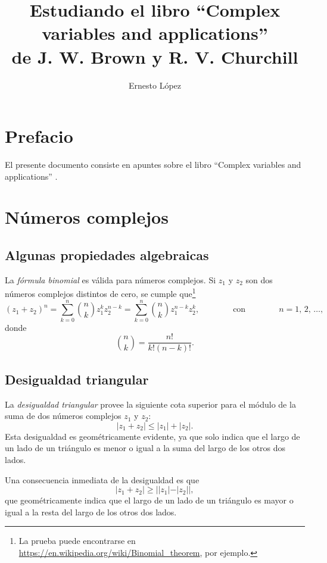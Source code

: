 \documentclass[a4paper]{report}
\title{Estudiando el libro ``Complex variables and applications''\\de J. W. Brown y R. V. Churchill}
\author{Ernesto López}
\begin{document}
 

\hypersetup{pageanchor=false}
\maketitle
\hypersetup{pageanchor=true}
\tableofcontents


\chapter*{Prefacio}

El presente documento consiste en apuntes sobre el libro ``Complex variables and applications'' \cite{brown2013complex}.


\chapter{Números complejos}

\section{Algunas propiedades algebraicas}

La \emph{fórmula binomial} es válida para números complejos. Si \(z_1\) y \(z_2\) son dos números complejos distintos de cero, se cumple que\footnote{La prueba puede encontrarse en \url{https://en.wikipedia.org/wiki/Binomial_theorem}, por ejemplo.} 
\begin{equation}\label{eq:binomial_theorem}
 (z_1+z_2)^n=\sum_{k=0}^n\binom{n}{k}z_1^{k}z_2^{n-k}=\sum_{k=0}^n\binom{n}{k}z_1^{n-k}z_2^k,
 \qquad\qquad\textrm{con}\qquad\qquad
 n=1,\,2,\,\dots,
\end{equation}
donde
\[
 \binom{n}{k}=\frac{n!}{k!(n-k)!}.
\]

\section{Desigualdad triangular}\label{sec:triangle_inequality}

La \emph{desigualdad triangular} provee la siguiente cota superior para el módulo de la suma de dos números complejos \(z_1\) y \(z_2\):
\[
 |z_1+z_2|\leq|z_1|+|z_2|.
\]
Esta desigualdad es geométricamente evidente, ya que solo indica que el largo de un lado de un triángulo es menor o igual a la suma del largo de los otros dos lados. 

Una consecuencia inmediata de la desigualdad es que 
\[
 |z_1+z_2|\geq||z_1|-|z_2||,
\]
que geométricamente indica que el largo de un lado de un triángulo es mayor o igual a la resta del largo de los otros dos lados.
\end{document}

